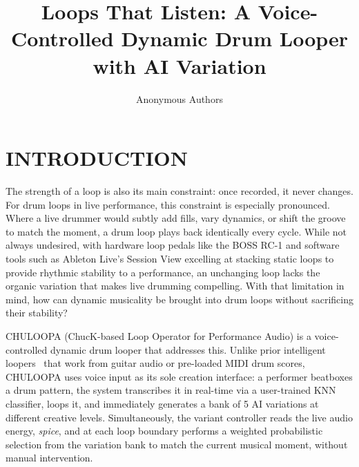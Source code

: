 \documentclass{aimc2026}
\title{Loops That Listen: A Voice-Controlled Dynamic Drum Looper with AI Variation}
\author{Anonymous Authors}
\begin{document}

\thispagestyle{firstpage}

\section{INTRODUCTION}

The strength of a loop is also its main constraint: once recorded, it never changes. For drum loops in live performance, this constraint is especially pronounced. Where a live drummer would subtly add fills, vary dynamics, or shift the groove to match the moment, a drum loop plays back identically every cycle. While not always undesired, with hardware loop pedals like the BOSS RC-1 and software tools such as Ableton Live's Session View excelling at stacking static loops to provide rhythmic stability to a performance, an unchanging loop lacks the organic variation that makes live drumming compelling. With that limitation in mind, how can dynamic musicality be brought into drum loops without sacrificing their stability?

CHULOOPA (ChucK-based \citep{wang2015chuck} Loop Operator for Performance Audio) is a voice-controlled dynamic drum looper that addresses this. Unlike prior intelligent loopers~\citep{marchini2017reflexive,burloiu2020rolypoly} that work from guitar audio or pre-loaded MIDI drum scores, CHULOOPA uses voice input as its sole creation interface: a performer beatboxes a drum pattern, the system transcribes it in real-time via a user-trained KNN classifier, loops it, and immediately generates a bank of 5 AI variations at different creative levels. Simultaneously, the variant controller reads the live audio energy, \emph{spice}, and at each loop boundary performs a weighted probabilistic selection from the variation bank to match the current musical moment, without manual intervention.
\end{document}

